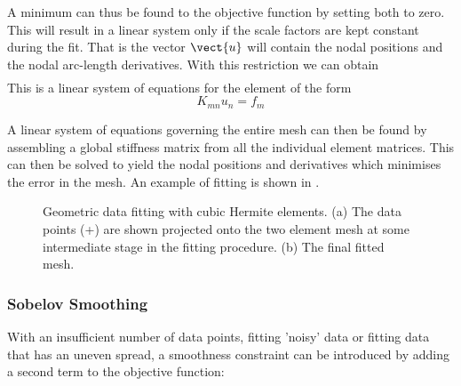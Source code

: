 A minimum can thus be found to the objective function by setting both 
 to zero. This will result in
a linear system only if the scale factors are kept constant during the fit. 
That is the vector $\vect{u}$ will contain the nodal positions and the nodal
arc-length derivatives. With this restriction we can obtain
\begin{eqnarray*}
\end{eqnarray*}
This is a linear system of equations for the element of the form
\begin{equation}
  K_{mn}u_{n}=f_{m}
  \label{eqn:linsystem}
\end{equation}

A linear system of equations governing the entire mesh can then be found by
assembling a global stiffness matrix from all the individual element matrices.
This can then be solved to yield the nodal positions and derivatives which
minimises the error in the mesh. An example of fitting is shown in
.

\begin{figure} \centering
  
  \caption{Geometric data fitting with cubic Hermite elements. (a) The data
     points (+) are shown projected onto the two element mesh at some 
     intermediate stage in the fitting procedure. (b) The final fitted mesh.}
  \label{fig:cubHermfit}
\end{figure}

\subsubsection{Sobelov Smoothing}

With an insufficient number of data points, fitting 'noisy' data or fitting
data that has an uneven spread, a smoothness constraint \cite{young:1989}
can be introduced by adding a second term to the objective function:

